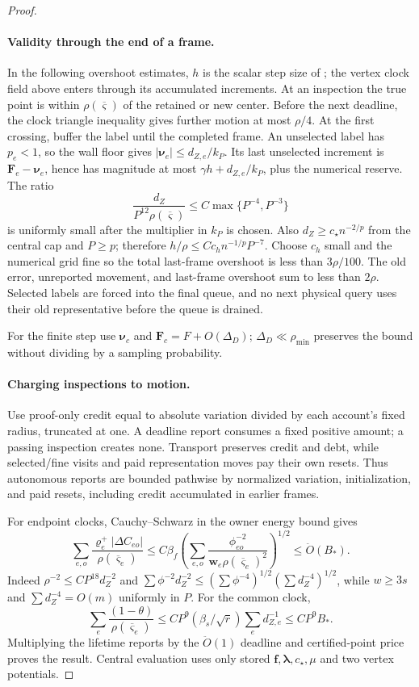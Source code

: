 \documentclass[11pt]{article}
\theoremstyle{remark}
\newcommand{\ff}{\mathbf f}
\newcommand{\llambda}{\boldsymbol{\lambda}}
\newcommand{\ww}{\mathbf w}
\newcommand{\vvsbar}{\overline{\boldsymbol{\varsigma}}}
\newcommand{\vvr}{\boldsymbol{\varrho}}
\newcommand{\FF}{\mathbf F}
\newcommand{\nnu}{\boldsymbol{\nu}}
\renewcommand{\O}{\ddot{O}}
\begin{document}
\begin{proof}
\paragraph{Validity through the end of a frame.}
In the following overshoot estimates, $h$ is the scalar step size of
; the vertex clock field above enters through its
accumulated increments.
At an inspection the true point is within $\rho(\vvsbar)$ of the retained or new
center.
Before the next deadline, the clock triangle inequality gives further motion at
most $\rho/4$.
At the first crossing, buffer the label until the completed frame.
An unselected label has $p_e<1$, so the wall floor gives $|\nnu_e|\le
d_{Z,e}/k_P$.
Its last unselected increment is $\FF_e-\nnu_e$, hence has magnitude at most
$\gamma h+d_{Z,e}/k_P$, plus the numerical reserve.
The ratio
\[
 \frac{d_Z}{P^{12}\rho(\vvsbar)}
 \le C\max\{P^{-4},P^{-3}\}
\]
is uniformly small after the multiplier in $k_P$ is chosen.
Also $d_Z\ge c_\star n^{-2/p}$ from the central cap and $P\ge p$; therefore $h/\rho\le
Cc_h n^{-1/p}P^{-7}$.
Choose $c_h$ small and the numerical grid fine so the total last-frame overshoot
is less than $3\rho/100$.
The old error, unreported movement, and last-frame overshoot sum to less than
$2\rho$.
Selected labels are forced into the final queue, and no next physical query uses
their old representative before the queue is drained.

For the finite step use $\nnu_c$ and $\FF_c=F+O(\Delta_D)$;
$\Delta_D\ll\rho_{\min}$ preserves the bound without dividing by a sampling
probability.

\paragraph{Charging inspections to motion.}
Use proof-only credit equal to absolute variation divided by each account's
fixed radius, truncated at one.
A deadline report consumes a fixed positive amount; a passing inspection creates
none.
Transport preserves credit and debt, while selected/fine visits and paid
representation moves pay their own resets.
Thus autonomous reports are bounded pathwise by normalized variation,
initialization, and paid resets, including credit accumulated in earlier frames.

For endpoint clocks, Cauchy--Schwarz in the owner energy bound gives
\[
 \sum_{e,o}\frac{\vvr_e^+|\Delta C_{eo}|}{\rho(\vvsbar_e)}
 \le C\beta_f\left(\sum_{e,o}
       \frac{\phi_{eo}^{-2}}{\ww_e\rho(\vvsbar_e)^2}\right)^{1/2}
 \le \O(B_*).
\]
Indeed $\rho^{-2}\le CP^{18}d_Z^{-2}$ and $\sum\phi^{-2}d_Z^{-2}\le
(\sum\phi^{-4})^{1/2}(\sum d_Z^{-4})^{1/2}$, while $w\ge3s$ and $\sum
d_Z^{-4}=O(m)$ uniformly in $P$.
For the common clock,
\[
 \sum_e\frac{(1-\theta)}{\rho(\vvsbar_e)}
 \le CP^9(\beta_s/\sqrt r)\sum_ed_{Z,e}^{-1}
 \le CP^9 B_*.
\]
Multiplying the lifetime reports by the $\O(1)$ deadline and
certified-point price proves the result.
Central evaluation uses only stored $\ff,\llambda,c_\star,\mu$ and two vertex potentials.
\end{proof}
\end{document}
